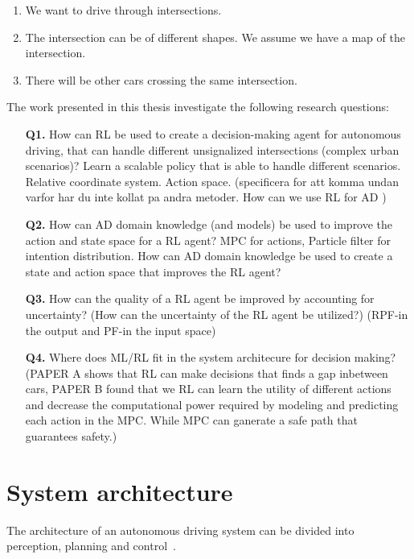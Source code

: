 \begin{enumerate}
	\item We want to drive through intersections. 
	\item The intersection can be of different shapes. We assume we have a map of the intersection. 
	\item There will be other cars crossing the same intersection. 
	
\end{enumerate}

The work presented in this thesis investigate the following research questions:
\begin{enumerate}
	\item[\textbf{Q1.}] How can RL be used to create a decision-making agent for autonomous driving, that can handle different unsignalized intersections (complex urban scenarios)? Learn a scalable policy that is able to handle different scenarios. Relative coordinate system. Action space. 
	(specificera for att komma undan varfor har du inte kollat pa andra metoder. How can we use RL for AD )
	\item[\textbf{Q2.}] How can AD domain knowledge (and models) be used to improve the action and state space for a RL agent? MPC for actions, Particle filter for intention distribution. How can AD domain knowledge be used to create a state and action space that improves the RL agent?
	\item[\textbf{Q3.}] How can the quality of a RL agent be improved by accounting for uncertainty?
	(How can the uncertainty of the RL agent be utilized?) (RPF-in the output and PF-in the input space)

	\item[\textbf{Q4.}] Where does ML/RL fit in the system architecure for decision making?
	(PAPER A shows that RL can make decisions that finds a gap inbetween cars, PAPER B found that we RL can learn the utility of different actions and decrease the computational power required by modeling and predicting each action in the MPC. While MPC can ganerate a safe path that guarantees safety.) 
\end{enumerate}

\section{System architecture}
\label{sec:system_architecture}
The architecture of an autonomous driving system can be divided into perception, planning and control~\cite{Schwarting2018, koretenkamp2016}. 

